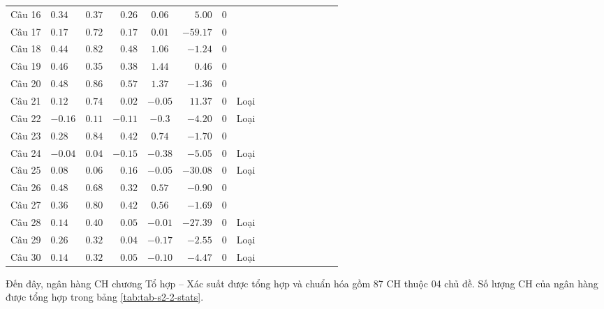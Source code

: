 \begin{longtable}{SlSrSrSrSrSrSrSc}
	Câu 16 & $0.34$  & $0.37$ & $0.26$  & $0.06$  & $5.00$   & $0$ &      \\
	Câu 17 & $0.17$  & $0.72$ & $0.17$  & $0.01$  & $-59.17$ & $0$ &      \\
	Câu 18 & $0.44$  & $0.82$ & $0.48$  & $1.06$  & $-1.24$  & $0$ &      \\
	Câu 19 & $0.46$  & $0.35$ & $0.38$  & $1.44$  & $0.46$   & $0$ &      \\
	Câu 20 & $0.48$  & $0.86$ & $0.57$  & $1.37$  & $-1.36$  & $0$ &      \\
	Câu 21 & $0.12$  & $0.74$ & $0.02$  & $-0.05$ & $11.37$  & $0$ & Loại \\
	Câu 22 & $-0.16$ & $0.11$ & $-0.11$ & $-0.3$  & $-4.20$  & $0$ & Loại \\
	Câu 23 & $0.28$  & $0.84$ & $0.42$  & $0.74$  & $-1.70$  & $0$ &      \\
	Câu 24 & $-0.04$ & $0.04$ & $-0.15$ & $-0.38$ & $-5.05$  & $0$ & Loại \\
	Câu 25 & $0.08$  & $0.06$ & $0.16$  & $-0.05$ & $-30.08$ & $0$ & Loại \\
	Câu 26 & $0.48$  & $0.68$ & $0.32$  & $0.57$  & $-0.90$  & $0$ &      \\
	Câu 27 & $0.36$  & $0.80$ & $0.42$  & $0.56$  & $-1.69$  & $0$ &      \\
	Câu 28 & $0.14$  & $0.40$ & $0.05$  & $-0.01$ & $-27.39$ & $0$ & Loại \\
	Câu 29 & $0.26$  & $0.32$ & $0.04$  & $-0.17$ & $-2.55$  & $0$ & Loại \\
	Câu 30 & $0.14$  & $0.32$ & $0.05$  & $-0.10$ & $-4.47$  & $0$ & Loại \\
\end{longtable}

Đến đây, ngân hàng CH chương Tổ hợp – Xác suất được tổng hợp và chuẩn hóa gồm 87 CH thuộc 04 chủ đề. Số lượng CH của ngân hàng được tổng hợp trong bảng \ref{tab:tab-s2-2-stats}.\par

